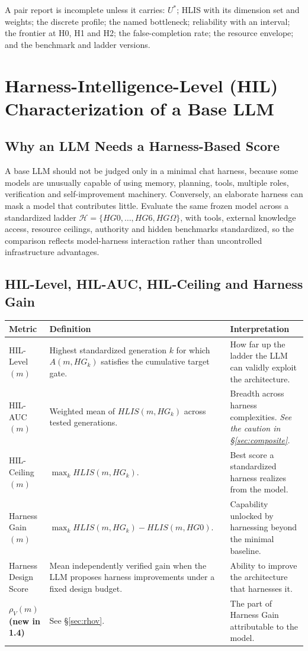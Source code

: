 \documentclass[11pt]{article}
\theoremstyle{definition}
\newcommand{\Om}{\ensuremath{\Omega}}
\newcommand{\rhov}{\ensuremath{\rho_V}}
\begin{document}
A pair report is incomplete unless it carries: $U^{*}$; HLIS with its dimension set and weights; the discrete profile; the named bottleneck; reliability with an interval; the frontier at H0, H1 and H2; the false-completion rate; the resource envelope; and the benchmark and ladder versions.

\section{Harness-Intelligence-Level (HIL) Characterization of a Base LLM}

\subsection{Why an LLM Needs a Harness-Based Score}

A base LLM should not be judged only in a minimal chat harness, because some models are unusually capable of using memory, planning, tools, multiple roles, verification and self-improvement machinery. Conversely, an elaborate harness can mask a model that contributes little. Evaluate the same frozen model across a standardized ladder $\mathcal{H} = \{HG0, \ldots, HG6, HG\Om{}\}$, with tools, external knowledge access, resource ceilings, authority and hidden benchmarks standardized, so the comparison reflects model-harness interaction rather than uncontrolled infrastructure advantages.

\subsection{HIL-Level, HIL-AUC, HIL-Ceiling and Harness Gain}

\begin{table}[h]
\centering\small
\begin{tabularx}{\textwidth}{@{}lYY@{}}
\toprule
Metric & Definition & Interpretation \\
\midrule
HIL-Level$(m)$ & Highest standardized generation $k$ for which $A(m,HG_k)$ satisfies the cumulative target gate. & How far up the ladder the LLM can validly exploit the architecture. \\
HIL-AUC$(m)$ & Weighted mean of $HLIS(m,HG_k)$ across tested generations. & Breadth across harness complexities. \emph{See the caution in \S\ref{sec:composite}.} \\
HIL-Ceiling$(m)$ & $\max_k HLIS(m,HG_k)$. & Best score a standardized harness realizes from the model. \\
Harness Gain$(m)$ & $\max_k HLIS(m,HG_k) - HLIS(m,HG0)$. & Capability unlocked by harnessing beyond the minimal baseline. \\
Harness Design Score & Mean independently verified gain when the LLM proposes harness improvements under a fixed design budget. & Ability to improve the architecture that harnesses it. \\
\textbf{$\rhov{}(m)$ (new in 1.4)} & See \S\ref{sec:rhov}. & The part of Harness Gain attributable to the model. \\
\bottomrule
\end{tabularx}
\end{table}
\end{document}

